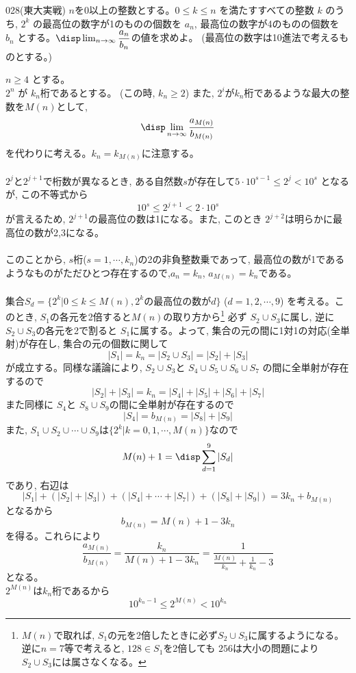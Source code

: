 \begin{thm}{028}{}{(東大実戦)}
 $n$を0以上の整数とする。$0\leq k\leq n$ を満たすすべての整数 $k$ のうち, $2^k$ の最高位の数字が1のものの個数を $a_n$, 最高位の数字が4のものの個数を $b_n$ とする。$\disp\lim_{n\to \infty} \dfrac{a_n}{b_n}$の値を求めよ。 (最高位の数字は10進法で考えるものとする。)
\end{thm}

$n\geq 4$ とする。\\
$2^n$ が $k_n$桁であるとする。 (この時, $k_n\geq 2$) また,  $2^i$が$k_n$桁であるような最大の整数を$M(n)$として,
\[\disp\lim_{n\to \infty} \dfrac{a_{M(n)}}{b_{M(n)}}\]
を代わりに考える。$k_n=k_{M(n)}$に注意する。
\\
\\
$2^{j}$と$2^{j+1}$で桁数が異なるとき, ある自然数$s$が存在して$5\cdot 10^{s-1}\leq 2^j< 10^{s}$ となるが, この不等式から
\[10^{s}\leq 2^{j+1}< 2\cdot 10^{s}\] 
が言えるため, $2^{j+1}$の最高位の数は1になる。また, このとき $2^{j+2}$は明らかに最高位の数が2,3になる。\\
\\
このことから, $s$桁($s=1,\cdots, k_n$)の2の非負整数乗であって, 最高位の数が1であるようなものがただひとつ存在するので,$a_n=k_n$,  $a_{M(n)}=k_{n}$である。\\
\\
集合$S_d=\{ 2^{k} | 0\leq k\leq M(n), 2^k\mbox{の最高位の数が$d$}\}$  ($d=1,2,\cdots ,9$) を考える。このとき, $S_1$の各元を2倍すると$M(n)$の取り方から\footnote{$M(n)$で取れば, $S_1$の元を2倍したときに必ず$S_2\cup S_3$に属するようになる。逆に$n=7$等で考えると, $128\in S_1$を2倍しても $256$は大小の問題により $S_2\cup S_3$には属さなくなる。}
必ず $S_2\cup S_3$に属し, 逆に $S_2\cup S_3$の各元を2で割ると $S_1$に属する。よって, 集合の元の間に1対1の対応(全単射)が存在し, 集合の元の個数に関して
\[|S_1|=k_n=|S_2\cup S_3|=|S_2|+|S_3|\]
が成立する。同様な議論により, $S_2\cup S_3$と $S_4\cup S_5\cup S_6 \cup S_7$ の間に全単射が存在するので
\[|S_2|+|S_3|=k_n=|S_4|+|S_5|+|S_6|+|S_7|\]
また同様に $S_4$と $S_8\cup S_9$の間に全単射が存在するので
\[|S_4|=b_{M(n)}=|S_8|+|S_9|\]
また, $S_1\cup S_2\cup \cdots \cup S_9$は$\{2^{k}| k=0,1,\cdots , M(n)\}$なので
\[M(n)+1=\disp\sum_{d=1}^9 |S_d|\]
であり, 右辺は
\[|S_1| +(|S_2|+|S_3|)+(|S_4|+\cdots +|S_7|) +(|S_8|+|S_9|)=3k_n+b_{M(n)}\]
となるから 
\[b_{M(n)}=M(n)+1-3k_{n}\]
を得る。これらにより
\[\dfrac{a_{M(n)}}{b_{M(n)}}=\dfrac{k_n}{M(n)+1-3k_{n}}=\dfrac{1}{\frac{M(n)}{k_n} +\frac{1}{k_n}-3}\]
となる。\\
$2^{M(n)}$は$k_n$桁であるから
\[10^{k_n-1}\leq 2^{M(n)}<10^{k_n}\]
